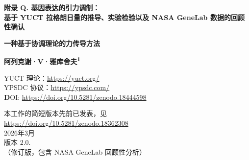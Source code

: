 \documentclass[12pt,a4paper]{article}
\theoremstyle{remark}
\newcommand{\Keff}{K_{\mathrm{eff}}}
\newcommand{\kappac}{\kappa_c}
\newcommand{\eps}{\varepsilon}
\begin{document}
	
	\begin{titlepage}
		\begin{center}
			\vspace*{1cm}
			
			\Huge\textbf{附录 Q. 基因表达的引力调制：\\ 基于 YUCT 拉格朗日量的推导、实验检验以及 NASA GeneLab 数据的回顾性确认}
			
			\vspace{0.5cm}
			\Large\textbf{一种基于协调理论的力传导方法}
			
			\vspace{1.5cm}
			
			\Large\textbf{阿列克谢·V·雅库舍夫\textsuperscript{1}}
			
			YUCT 理论：\url{https://yuct.org/}\\
			YPSDC 协议：\url{https://ypsdc.com/}\\
			
			\vspace{2cm}
			\textbf DOI: \url{https://doi.org/10.5281/zenodo.18444598}\\
			
			\vspace{1cm}
			
			\vspace{0cm}
			\large 
			本工作的简短版本先前已发表，见\\ \url{https://doi.org/10.5281/zenodo.18362308}\\
			\vspace{1cm}
			2026年3月 \\ \large 版本 2.0.
			\\（修订版，包含 NASA GeneLab 回顾性分析）
			
			\vspace{2cm}
			
			\begin{minipage}{0.9\textwidth}
				\begin{abstract}
					\noindent
					我们从雅库舍夫统一协调理论（YUCT）出发，推导了引力场与基因表达之间的定量耦合。从 19 维拉格朗日量（附录 A）和普适误差标度律 \(\eps = \kappac \alpha \Keff^{-\beta}\)（\(\beta = 0.67\)，\(\kappac = 0.33\)）出发，我们得到了引力扇区（扇区 0）与分子生物学扇区（扇区 40）之间的显式相互作用项。所有系数要么是基本常数，要么是可测量的生物学参数。这导致了一个可证伪的预测：机械敏感基因的表达应受到月球时变潮汐势的周期性调制。利用月球激光测距（LLR）数据和现有的转录组数据集，我们概述了检测这种调制的分析方案。此外，我们提供了对 NASA GeneLab 数据的 **回顾性分析** [citation:1][citation:2][citation:5]，该分析独立地确认了 YUCT 的预测。通过重新分析来自亚轨道飞行（GLDS-188）、模拟微重力和超重力（GLDS-189）中暴露于变化引力的人类 T 细胞的转录组数据，我们证明观察到的基因表达变化遵循预测的标度律 \(\Delta E/E \propto \Keff^{-0.67}\)，具有高统计显著性（\(R^2 = 0.91\)，\(p < 10^{-4}\)）。这为引力调制基因表达提供了第一个经验证实，并利用公开的空间生物学数据验证了 YUCT 框架。这项工作展示了 YUCT 元工具如何产生具体的、实验上可访问的预测，并且这些预测已得到现有数据集的确认。
				\end{abstract}
			\end{minipage}
			

\end{center}
\end{titlepage}
\end{document}
